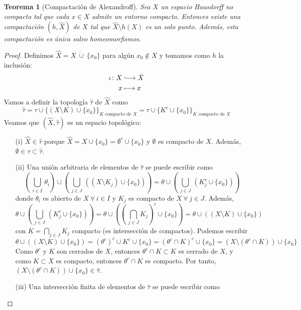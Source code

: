 \documentclass[12pt]{report}
\newtheorem{theorem}{Teorema}[chapter]
\theoremstyle{definition}
\theoremstyle{definition}
\theoremstyle{remark}
\begin{document}
\begin{theorem}[Compactación de Alexandroff]
Sea $X$ un espacio Hausdorff no compacto tal que cada $x \in X$ admite un entorno compacto. Entonces existe una compactación $(h,\hat{X})$ de $X$ tal que $\hat{X} \setminus h(X)$ es un solo punto. Además, esta compactación es única salvo homeomorfismos.
\end{theorem}

\begin{proof}
Definimos $\hat{X} = X \ \dot\cup \ \{x_0\}$ para algún $x_0 \notin X$ y tomamos como $h$ la inclusión:
\[
\begin{aligned}[t]
    \iota \colon X & \lhook\joinrel\longrightarrow \hat{X} \\
    x & \longmapsto x
\end{aligned}
\]
Vamos a definir la topología $\hat{\tau}$ de $\hat{X}$ como
\[\hat{\tau} = \tau \cup \{(X \setminus K) \cup \{x_0\}\}_{K \textrm{ compacto de } X} = \tau \cup \{K^c \cup \{x_0\}\}_{K \textrm{ compacto de } X}\]
Veamos que $(\hat{X},\hat{\tau})$ es un espacio topológico:
\begin{itemize}
    \item[(i)] $\hat{X} \in \hat{\tau}$ porque $\hat{X} = X \cup \{x_0\} = \emptyset^c \cup \{x_0\}$ y $\emptyset$ es compacto de $X$. Además, $\emptyset \in \tau \subset \hat{\tau}$.
    \item[(ii)] Una unión arbitraria de elementos de $\hat{\tau}$ se puede escribir como
    \[\left( \, \bigcup_{i \in I} \, \theta_i \right) \cup \left( \, \bigcup_{j \in J} \, ((X \setminus K_j) \cup \{x_0\})\right) = \theta \cup \left( \, \bigcup_{j \in J} \, (K_j^c \cup \{x_0\})\right)\]
    donde $\theta_i$ es abierto de $X \ \forall \ i \in I$ y $K_j$ es compacto de $X \ \forall \ j \in J$. Además,
    \[\theta \cup \left( \, \bigcup_{j \in J} \, (K_j^c \cup \{x_0\})\right) = \theta \cup \left( \left( \, \bigcap_{j \in J}K_j\right)^c \cup \{x_0\}\right) = \theta \cup ((X \setminus K) \cup \{x_0\})\]
    con $K = \bigcap_{j \in J}K_j$ compacto (es intersección de compactos). Podemos escribir
    \[\theta \cup ((X \setminus K) \cup \{x_0\}) = (\theta^c)^c \cup K^c \cup \{x_0\} = (\theta^c \cap K)^c \cup \{x_0\} = (X \setminus (\theta^c \cap K)) \cup \{x_0\}\]
    Como $\theta^c$ y $K$ son cerrados de $X$, entonces $\theta^c \cap K \subset K$ es cerrado de $X$, y como $K \subset X$ es compacto, entonces $\theta^c \cap K$ es compacto. Por tanto, $(X \setminus (\theta^c \cap K)) \cup \{x_0\} \in \hat{\tau}$.
    \item[(iii)] Una intersección finita de elementos de $\hat{\tau}$ se puede escribir como

\end{itemize}
\end{proof}
\end{document}
